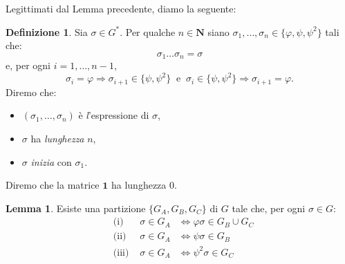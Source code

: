 \documentclass[a4paper,oneside,11pt]{book}
\theoremstyle{definition} \newtheorem{Def}{Definizione}
\theoremstyle{plain} \newtheorem{teo}{Teorema}
\theoremstyle{plain} \newtheorem{cor}[teo]{Corollario}
\theoremstyle{definition} \newtheorem{lem}[teo]{Lemma}
\theoremstyle{plain} \newtheorem{pro}[teo]{Proposizione}
\begin{document}
	Legittimati dal Lemma precedente, diamo la seguente:
	\begin{Def}
		Sia $\sigma \in G^*$. Per qualche $n \in \mathbf{N}$ siano $\sigma_1, \dots, \sigma_n \in \{\varphi, \psi, \psi^2\}$ tali che:
		\begin{equation*}
			\sigma_1 \dots \sigma_n = \sigma
		\end{equation*}
		e, per ogni $i = 1, \dots, n-1$,
		\begin{equation*}
			\sigma_i = \varphi \Rightarrow \sigma_{i+1} \in \{\psi, \psi^2\}\ \text{ e }\ \sigma_i \in \{\psi, \psi^2\} \Rightarrow \sigma_{i+1} = \varphi \text{.}
		\end{equation*}
		Diremo che:
		\begin{itemize}
			\item $(\sigma_1, \dots, \sigma_n)$ è \emph{l}'espressione di $\sigma$,
			\item $\sigma$ ha \emph{lunghezza} $n$,
			\item $\sigma$ \emph{inizia} con $\sigma_1$.
		\end{itemize}
		
		Diremo che la matrice $\mathbf{1}$ ha lunghezza $0$.
	\end{Def}
	
	\begin{lem}
		Esiste una partizione $\{G_A, G_B, G_C\}$ di $G$ tale che, per ogni $\sigma \in G$:
		\begin{equation}\label{phpgp} %
			\begin{aligned}
				&\text{(i) } &\sigma \in G_A & \Leftrightarrow \varphi\sigma \in G_B \cup G_C\\
				&\text{(ii) } &\sigma \in G_A & \Leftrightarrow \psi\sigma \in G_B\\
				&\text{(iii) } &\sigma \in G_A & \Leftrightarrow \psi^2\sigma \in G_C\\
			\end{aligned}
		\end{equation}
	\end{lem}
	
\end{document}

